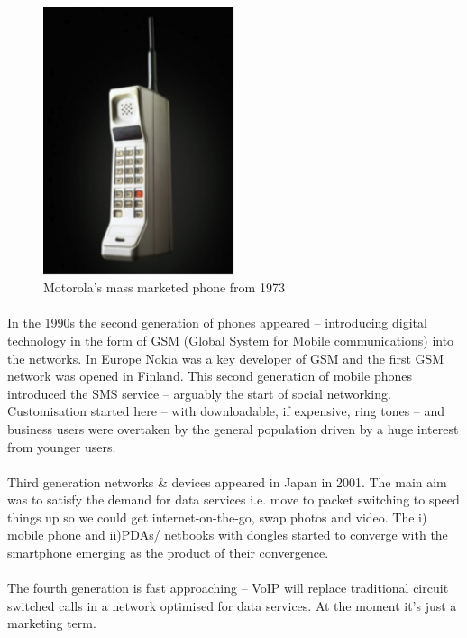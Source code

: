 \documentclass[12pt, a4paper, twoside]{book}
\begin{document}
\begin{figure}[htb]
\centering
\includegraphics[width=0.5\textwidth]{images/brick-phone}
\caption{Motorola's mass marketed phone from 1973}
\label{fig:brick-phone}
\end{figure}

\paragraph{} In the 1990s the second generation of phones appeared – introducing digital technology in the form of GSM (Global System for Mobile communications) into the networks. In Europe Nokia was a key developer of GSM and the first GSM network was opened in Finland. This second generation of mobile phones introduced the SMS service – arguably the start of social networking. Customisation started here – with downloadable, if expensive, ring tones – and business users were overtaken by the general population driven by a huge interest from younger users.

\paragraph{} Third generation networks \& devices appeared in Japan in 2001. The main aim was to satisfy the demand for data services  i.e. move to packet switching to speed things up so we could get internet-on-the-go, swap photos and video. The i) mobile phone and ii)PDAs/ netbooks with dongles started to converge with the smartphone emerging as the product of their convergence. 

\paragraph{} The fourth generation is fast approaching – VoIP will replace traditional circuit switched calls in a network optimised for data services. At the moment it’s just a marketing term.
\end{document}
